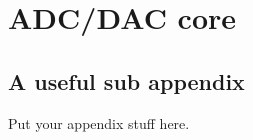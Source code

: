 \chapter{\label{app:myappendix}ADC/DAC core}

\section{\label{app:sec:myappendix}A useful sub appendix}

Put your appendix stuff here.
